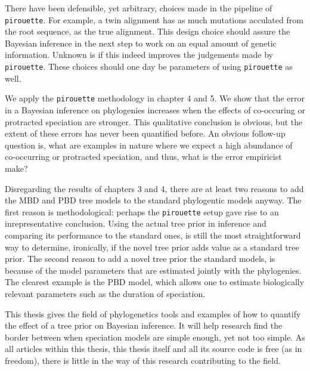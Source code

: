 There have been defensible, yet arbitrary, choices made in the pipeline
of \verb;pirouette;. For example, a twin alignment has as much
mutations acculated from the root sequence, as the true alignment. 
This design choice should assure the Bayesian inference in the next step
to work on an equal amount of genetic information. Unknown is if this
indeed improves the judgements made by \verb;pirouette;. These choices
should one day be parameters of using \verb;pirouette; as well.

We apply the \verb;pirouette; methodology in chapter 4 and 5.
We show that the error in a Bayesian inference on
phylogenies increases when the effects of co-occuring 
or protracted speciation are stronger. 
This qualitative conclusion is obvious, 
but the extent of these errors has never been quantified before.
An obvious follow-up question is, 
what are examples in nature where we expect a high 
abundance of co-occurring or protracted speciation, 
and thus, what is the
error empiricist make?

Disregarding the results of chapters 3 and 4, there are
at least two reasons to add the MBD and PBD tree models to the standard
phylogentic models anyway. The first reason is methodological: perhaps
the \verb;pirouette; setup gave rise to an inrepresentative conclusion.
Using the actual tree prior in inference and comparing its performance
to the standard ones, is still the most straightforward way to determine,
ironically, if the novel tree prior adds value as a standard tree prior.
The second reason to add a novel tree prior the standard models, is
because of the model parameters that are estimated jointly with the
phylogenies. The clearest example is the PBD model, which allows one
to estimate biologically relevant parameters such as the duration of speciation.

This thesis gives the field of phylogenetics tools and examples of
how to quantify the effect of a tree prior on Bayesian inference.
It will help research find the border between when speciation models are
simple enough, yet not too simple. As all articles within this thesis,
this thesis itself and all its source code is free (as in freedom),
there is little in the way of this research contributing to the field. 



